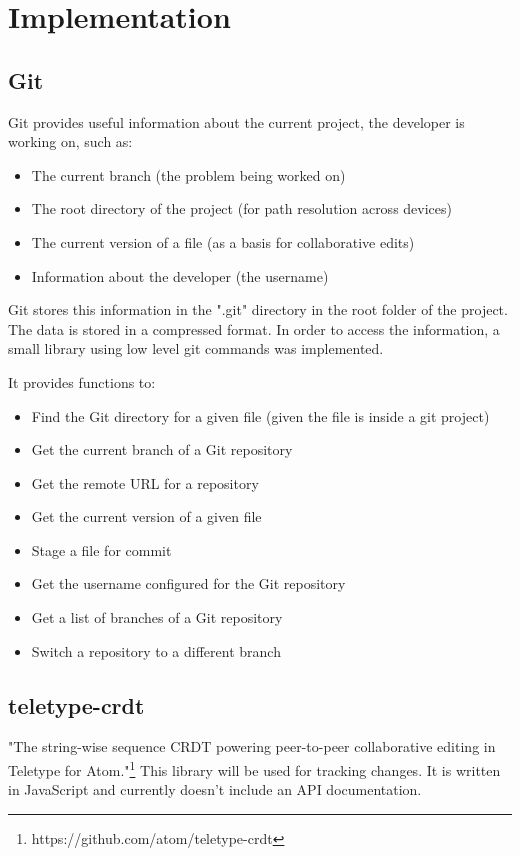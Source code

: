 \chapter{Implementation}

\section{Git}

Git provides useful information about the current project, the developer is working on, such as:
\begin{itemize}
    \item The current branch (the problem being worked on)
    \item The root directory of the project (for path resolution across devices)
    \item The current version of a file (as a basis for collaborative edits)
    \item Information about the developer (the username)
\end{itemize}

Git stores this information in the ".git" directory in the root folder of the project.
The data is stored in a compressed format. In order to access the information, a small library using low level git commands was implemented. 

It provides functions to:
\begin{itemize}
    \item Find the Git directory for a given file (given the file is inside a git project)
    \item Get the current branch of a Git repository
    \item Get the remote URL for a repository
    \item Get the current version of a given file
    \item Stage a file for commit
    \item Get the username configured for the Git repository
    \item Get a list of branches of a Git repository
    \item Switch a repository to a different branch
\end{itemize}

\section{teletype-crdt}

"The string-wise sequence CRDT powering peer-to-peer collaborative editing in Teletype for Atom."\footnote{https://github.com/atom/teletype-crdt}
This library will be used for tracking changes. It is written in JavaScript and currently doesn't include an API documentation.

